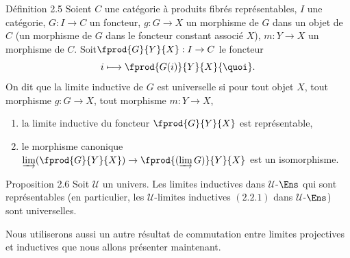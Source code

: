 \setcounter{subsection}{5}
\begin{enonce*}{Définition 2.5}
Soient $C$ une catégorie à produits fibrés représentables, $I$ une
catégorie, $G:I\rightarrow C$ un foncteur, $g:G\rightarrow X$ un
morphisme de $G$ dans un objet de $C$ (\ie un morphisme de $G$ dans
le foncteur constant associé $X$), $m:Y\rightarrow X$ un morphisme
de $C$. Soit\pageoriginale $\fprod{G}{Y}{X}:I\rightarrow C$ le
foncteur
$$
i\longmapsto \fprod{G(i)}{Y}{X} {\quoi}.
$$
On dit que la limite inductive de $G$ est universelle si pour tout
objet $X$, tout morphisme $g:G\rightarrow X$, tout morphisme
$m:Y\rightarrow X$,
\begin{enumerate}
\item[a)] la limite inductive du foncteur $\fprod{G}{Y}{X}$ est
  représentable,

\item[b)] le morphisme canonique $\varinjlim (\fprod{G}{Y}{X}
  )\rightarrow \fprod{(\varinjlim G)}{Y}{X}$ est un isomorphisme.
\end{enumerate}
\end{enonce*}

\begin{enonce*}{Proposition 2.6}
Soit $𝒰$ un univers. Les limites inductives dans
$𝒰$-$\Ens$ qui sont représentables (en particulier, les
$𝒰$-limites inductives $(2.2.1)$ dans $𝒰$-$\Ens$) %
sont universelles.
\end{enonce*}
Nous utiliserons aussi un autre résultat de commutation entre
limites projectives et inductives que nous allons présenter
maintenant.

